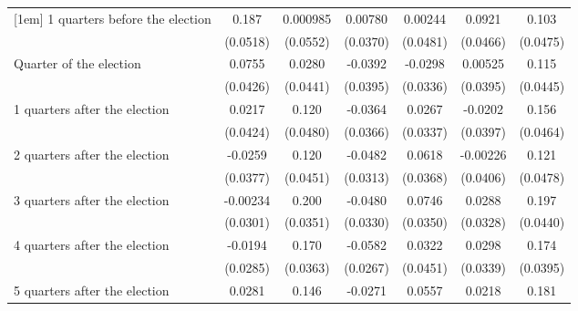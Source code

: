 \begin{table}[htbp]
\begin{tabular}{l*{6}{c}}
[1em]
 1 quarters before the election&       0.187\sym{***}&    0.000985         &     0.00780         &     0.00244         &      0.0921\sym{*}  &       0.103\sym{*}  \\
                    &    (0.0518)         &    (0.0552)         &    (0.0370)         &    (0.0481)         &    (0.0466)         &    (0.0475)         \\
[1em]
Quarter of the election&      0.0755         &      0.0280         &     -0.0392         &     -0.0298         &     0.00525         &       0.115\sym{**} \\
                    &    (0.0426)         &    (0.0441)         &    (0.0395)         &    (0.0336)         &    (0.0395)         &    (0.0445)         \\
[1em]
 1 quarters after the election&      0.0217         &       0.120\sym{*}  &     -0.0364         &      0.0267         &     -0.0202         &       0.156\sym{***}\\
                    &    (0.0424)         &    (0.0480)         &    (0.0366)         &    (0.0337)         &    (0.0397)         &    (0.0464)         \\
[1em]
 2 quarters after the election&     -0.0259         &       0.120\sym{**} &     -0.0482         &      0.0618         &    -0.00226         &       0.121\sym{*}  \\
                    &    (0.0377)         &    (0.0451)         &    (0.0313)         &    (0.0368)         &    (0.0406)         &    (0.0478)         \\
[1em]
 3 quarters after the election&    -0.00234         &       0.200\sym{***}&     -0.0480         &      0.0746\sym{*}  &      0.0288         &       0.197\sym{***}\\
                    &    (0.0301)         &    (0.0351)         &    (0.0330)         &    (0.0350)         &    (0.0328)         &    (0.0440)         \\
[1em]
 4 quarters after the election&     -0.0194         &       0.170\sym{***}&     -0.0582\sym{*}  &      0.0322         &      0.0298         &       0.174\sym{***}\\
                    &    (0.0285)         &    (0.0363)         &    (0.0267)         &    (0.0451)         &    (0.0339)         &    (0.0395)         \\
[1em]
 5 quarters after the election&      0.0281         &       0.146\sym{***}&     -0.0271         &      0.0557         &      0.0218         &       0.181\sym{***}\\

\end{tabular}
\end{table}
